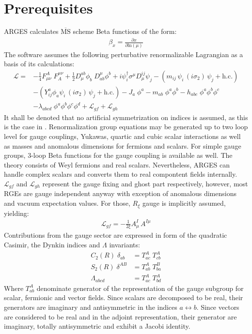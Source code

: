 \documentclass{scrartcl}
\begin{document}
\section{Prerequisites}
ARGES calculates $\overline{\mathrm{MS}}$ scheme Beta functions of the form:
\begin{align}
\beta_x = \frac{\partial x}{\partial \mathrm{ln}(\mu)}
\end{align}
The software assumes the following perturbative renormalizable Lagrangian as a basis of its calculations:
\begin{align}
\mathcal{L} = &-\frac{1}{4} F^A_{\mu\nu}\; F_A^{\mu \nu} + \frac{1}{2} D^{ab}_\mu \phi_b \; D_{ab}^\mu \phi^b + i \psi_i^\dagger \sigma^\mu D^{ij}_\mu \psi_j  - ( m_{ij}\, \psi_i \,(i \sigma_2)\, \psi_j + \mathrm{h.c.} )\nonumber \\
&- ( Y^a_{ij} \phi_a \psi_i \,(i \sigma_2)\, \psi_j + \mathrm{h.c.} ) - J_a \;\phi^a - m_{ab}\; \phi^a \phi^b - h_{abc}\; \phi^a \phi^b \phi^c \nonumber\\ &- \lambda_{abcd}\; \phi^a \phi^b \phi^c \phi^d  + \mathcal{L}_{gf} + \mathcal{L}_{gh}
\end{align}
It shall be denoted that no artificial symmetrization on indices is assumed, as this is the case in \cite{LuoWangXiao,MV1,MV2,MV3,vev1,vev2,gauge3L,gauge3L2}.
Renormalization group equations may be generated up to two loop level for gauge couplings, Yukawas, quartic and cubic scalar interactions as well as masses and anomalous dimensions for fermions and scalars. For simple gauge groups, 3-loop Beta functions for the gauge coupling is available as well.
The theory consists of Weyl fermions and real scalars. Nevertheless, ARGES can handle complex scalars and converts them to real compontent fields internally.
$\mathcal{L}_{gf}$ and $\mathcal{L}_{gh}$ represent the gauge fixing and ghost part respectively, however, most RGEs are gauge independent anyway with exception of anomalous dimensions and vacuum expectation values. For those, $R_\xi$ gauge is implicitly assumed, yielding:
\begin{align}
\mathcal{L}_{gf} = -\frac{1}{2 \xi} A^I_\mu \,A^{I \mu} 
\end{align}
Contributions from the gauge sector are expressed in form of the quadratic Casimir, the Dynkin indices and $\Lambda$ invariants:
\begin{align}
C_2(R)\;\delta_{ab} &= T^A_{ac} \;T^A_{cb} \label{casimir}\\
S_2(R) \;\delta^{AB} &= T^A_{ab} \; T^B_{ba} \label{dynkin}\\
\Lambda_{abcd} &= T^A_{ac} \; T^A_{bd} \label{lambda}
\end{align}
Where $T^A_{ab}$ denominate generator of the representation of the gauge subgroup for scalar, fermionic and vector fields. Since scalars are decomposed to be real, their generators are imaginary and antisymmetric in the indices $a \leftrightarrow b$. Since vectors are considered to be real and in the adjoint representation, their generator are imaginary, totally antisymmetric and exhibit a Jacobi identity.
\newpage
\end{document}
